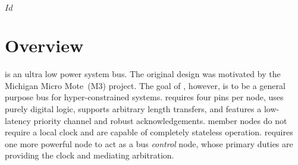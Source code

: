 \svnInfo $Id$

\section*{Overview}
\bus is an ultra low power system bus. The original design was motivated by
the Michigan Micro Mote~(M3) project. The goal of \bus, however, is to be a
general purpose bus for hyper-constrained systems. \bus requires four pins per
node, uses purely digital logic, supports arbitrary length transfers, and
features a low-latency priority channel and robust acknowledgements. \bus
member nodes do not require a local clock and are capable of completely
stateless operation. \bus requires one more powerful node to act as a bus {\em
control} node, whose primary duties are providing the \bus clock and mediating
arbitration.
